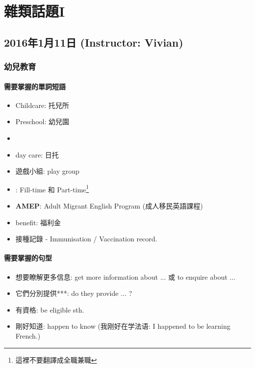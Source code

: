 \chapter{雜類話題I}
\section{2016年1月11日 (Instructor: Vivian)}
\subsection{幼兒教育}
\subsubsection*{需要掌握的單詞短語}
\begin{multicols}{2}
\begin{itemize}
  \itemsep0em
  \item Childcare: 托兒所
  \item Preschool: 幼兒園
  \item {}
  \item day care: 日托
  \item 遊戲小組: play group
  \item {}: Fill-time 和 Part-time\footnote{這裡不要翻譯成全職兼職}
  \item \textbf{AMEP}: Adult Migrant English Program (成人移民英語課程)
  \item benefit: 福利金
  \item 接種記錄 - Immunisation / Vaccination record.
\end{itemize}
\end{multicols}

\subsubsection*{需要掌握的句型}
\begin{itemize}
  \itemsep0em
  \item 想要瞭解更多信息: get more information about ... 或 to enquire about ...
  \item 它們分別提供***: do they  provide ... ?
  \item 有資格: be eligible  sth.
  \item 剛好知道: happen to know (我刚好在学法语: I happened to be learning French.)
\end{itemize}

